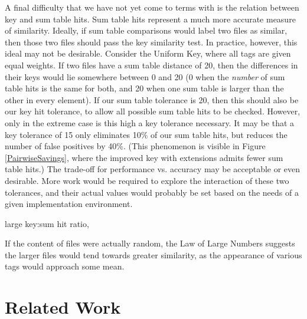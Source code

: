 \documentclass[10pt, twocolumn]{article}
\begin{document}
A final difficulty that we have not yet come to terms with is the relation between key and sum table hits.  Sum table hits represent a much more accurate measure of similarity.  Ideally, if sum table comparisons would label two files as similar, then those two files should pass the key similarity test.  In practice, however, this ideal may not be desirable.  Consider the Uniform Key, where all tags are given equal weights.  If two files have a sum table distance of 20, then the differences in their keys would lie somewhere between 0 and 20 (0 when the {\it number} of sum table hits is the same for both, and 20 when one sum table is larger than the other in every element).  If our sum table tolerance is 20, then this should also be our key hit tolerance, to allow all possible sum table hits to be checked.  However, only in the extreme case is this high a key tolerance necessary.  It may be that a key tolerance of 15 only eliminates 10\% of our sum table hits, but reduces the number of false positives by 40\%.  (This phenomenon is visible in Figure \ref{PairwiseSavings}, where the improved key with extensions admits fewer sum table hits.)  The trade-off for performance vs. accuracy may be acceptable or even desirable.  More work would be required to explore the interaction of these two tolerances, and their actual values would probably be set based on the needs of a given implementation environment.




large key:sum hit ratio, 



 If the content of files were actually random, the Law of Large Numbers suggests the larger files would tend towards greater similarity, as the appearance of various tags would approach some mean.  


\section{Related Work}
\end{document}
